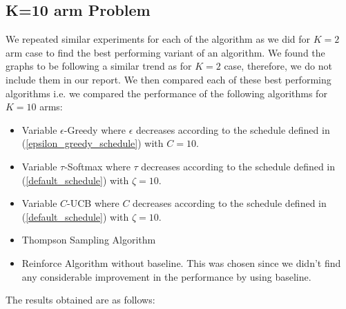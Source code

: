 \documentclass{article}
\begin{document}
	\subsection{K=10 arm Problem}
		\label{10_bernoulli_comparison}
		We repeated similar experiments for each of the algorithm as we did for $K=2$ arm case to find the best performing variant of an algorithm. We found the 
		graphs to be following a similar trend as for $K=2$ case, therefore, we do not include them in our report. We then compared each of these best performing
		algorithms i.e. we compared the performance of the following algorithms for $K=10$ arms:
		\begin{itemize}
			\item Variable $\epsilon$-Greedy where $\epsilon$ decreases according to the schedule defined in (\ref{epsilon_greedy_schedule}) with $C=10$.
			\item Variable $\tau$-Softmax where $\tau$ decreases according to the schedule defined in (\ref{default_schedule}) with $\zeta=10$.
			\item Variable $C$-UCB where $C$ decreases according to the schedule defined in (\ref{default_schedule}) with $\zeta=10$.
			\item Thompson Sampling Algorithm
			\item Reinforce Algorithm without baseline. This was chosen since we didn't find any considerable improvement in the performance by using baseline.
		\end{itemize}
		
		The results obtained are as follows:
		
\end{document}
